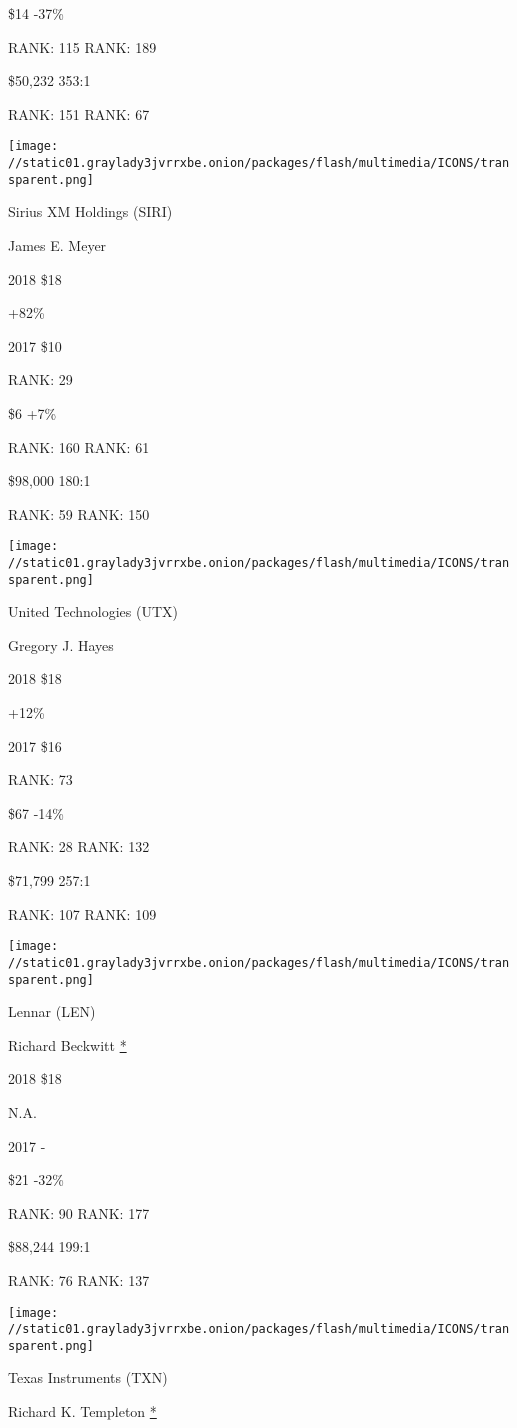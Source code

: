  \$14 -37\%

RANK: 115 RANK: 189

 \$50,232 353:1

RANK: 151 RANK: 67

\texttt{[image: //static01.graylady3jvrrxbe.onion/packages/flash/multimedia/ICONS/transparent.png]}

Sirius XM Holdings (SIRI)

James E. Meyer \protect\hyperlink{g-footnotes}{}

2018 \$18

 +82\%

2017 \$10

RANK: 29

 \$6 +7\%

RANK: 160 RANK: 61

 \$98,000 180:1

RANK: 59 RANK: 150

\texttt{[image: //static01.graylady3jvrrxbe.onion/packages/flash/multimedia/ICONS/transparent.png]}

United Technologies (UTX)

Gregory J. Hayes \protect\hyperlink{g-footnotes}{}

2018 \$18

 +12\%

2017 \$16

RANK: 73

 \$67 -14\%

RANK: 28 RANK: 132

 \$71,799 257:1

RANK: 107 RANK: 109

\texttt{[image: //static01.graylady3jvrrxbe.onion/packages/flash/multimedia/ICONS/transparent.png]}

Lennar (LEN)

Richard Beckwitt \protect\hyperlink{g-footnotes}{*}

2018 \$18

 N.A.

2017 -

 \$21 -32\%

RANK: 90 RANK: 177

 \$88,244 199:1

RANK: 76 RANK: 137

\texttt{[image: //static01.graylady3jvrrxbe.onion/packages/flash/multimedia/ICONS/transparent.png]}

Texas Instruments (TXN)

Richard K. Templeton \protect\hyperlink{g-footnotes}{*}

